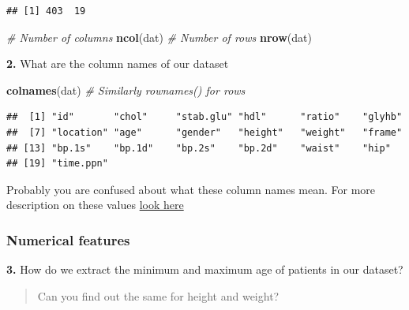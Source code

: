 \documentclass[
]{book}
\newenvironment{Shaded}{\begin{snugshade}}{\end{snugshade}}
\newcommand{\CommentTok}[1]{\textcolor[rgb]{0.56,0.35,0.01}{\textit{#1}}}
\newcommand{\FunctionTok}[1]{\textcolor[rgb]{0.13,0.29,0.53}{\textbf{#1}}}
\newcommand{\NormalTok}[1]{#1}
\newcommand{\SpecialCharTok}[1]{\textcolor[rgb]{0.81,0.36,0.00}{\textbf{#1}}}
\begin{document}
\begin{verbatim}
## [1] 403  19
\end{verbatim}

\begin{Shaded}
\begin{Highlighting}[]
\CommentTok{\# Number of columns}
\FunctionTok{ncol}\NormalTok{(dat)}
\CommentTok{\# Number of rows}
\FunctionTok{nrow}\NormalTok{(dat)}
\end{Highlighting}
\end{Shaded}

\textbf{2.} What are the column names of our dataset

\begin{Shaded}
\begin{Highlighting}[]
\FunctionTok{colnames}\NormalTok{(dat) }\CommentTok{\# Similarly rownames() for rows}
\end{Highlighting}
\end{Shaded}

\begin{verbatim}
##  [1] "id"       "chol"     "stab.glu" "hdl"      "ratio"    "glyhb"   
##  [7] "location" "age"      "gender"   "height"   "weight"   "frame"   
## [13] "bp.1s"    "bp.1d"    "bp.2s"    "bp.2d"    "waist"    "hip"     
## [19] "time.ppn"
\end{verbatim}

Probably you are confused about what these column names mean.
For more description on these values \href{https://biostat.app.vumc.org/wiki/pub/Main/DataSets/Cdiabetes.html}{look here}

\hypertarget{numerical-features}{%
\subsubsection{Numerical features}\label{numerical-features}}

\textbf{3.} How do we extract the minimum and maximum age of patients in our dataset?

\begin{Shaded}
\end{Shaded}

\begin{quote}
Can you find out the same for height and weight?
\end{quote}
\end{document}
